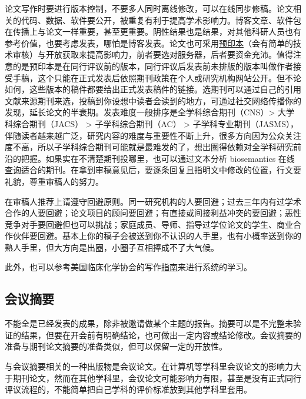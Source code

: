 \documentclass[]{tufte-book}
\begin{document}
论文写作时要进行版本控制，不要多人同时离线修改，可以在线同步修稿。论文相关的代码、数据、软件要公开，被重复有利于提高学术影响力。博客文章、软件包在传播上与论文一样重要，甚至更重要。阴性结果也是结果，对其他科研人员也有参考价值，也要考虑发表，哪怕是博客发表。论文也可采用\href{https://deevybee.blogspot.com/2018/06/preprint-publication-as-karaoke.html}{预印本}（会有简单的技术审核）与开放获取来提高影响力，前者要选对服务器，后者要资金充沛。值得注意的是预印本是在同行评议前的版本，同行评议后发表前未排版的版本叫做作者接受手稿，这个只能在正式发表后依照期刊政策在个人或研究机构网站公开。但不论如何，这些版本的稿件都要给出正式发表稿件的链接。选期刊可以通过自己的引用文献来源期刊来选，投稿到你设想中读者会读到的地方，可通过社交网络传播你的发现，延长论文的半衰期。发表难度一般排序是全学科综合期刊（CNS）\textgreater{} 大学科综合期刊（JACS） \textgreater{} 子学科综合期刊（AC） \textgreater{} 子学科专业期刊（JASMS），伴随读者越来越广泛，研究内容的难度与重要性不断上升，很多方向因为公众关注度不高，所以子学科综合期刊可能就是最难发的了，想出圈得依赖对全学科研究前沿的把握。如果实在不清楚期刊投哪里，也可以通过文本分析 biosemantics 在线\href{https://jane.biosemantics.org/index.php}{查询}适合的期刊。在拿到审稿意见后，要逐条回复且指明文中修改的位置，行文要礼貌，尊重审稿人的努力。

在审稿人推荐上请遵守回避原则。同一研究机构的人要回避；过去三年内有过学术合作的人要回避；论文项目的顾问要回避；有直接或间接利益冲突的要回避；恶性竞争对手要回避但也可以挑战；家庭成员、导师、指导过学位论文的学生、商业合作伙伴要回避。基本上你的稿子会被送到你不认识的人手里，也有小概率送到你的熟人手里，但大方向是出圈，小圈子互相捧成不了大气候。

此外，也可以参考美国临床化学协会的写作\href{http://www.aacc.org/publications/clin_chem/ccgsw/Pages/default.aspx}{指南}来进行系统的学习。

\hypertarget{ux4f1aux8baeux6458ux8981}{%
\subsection{会议摘要}\label{ux4f1aux8baeux6458ux8981}}

不能全是已经发表的成果，除非被邀请做某个主题的报告。摘要可以是不完整未验证的结果，但要在开会前有明确结论，也可做出一定内容或结论修改。会议摘要的准备与期刊论文摘要的准备类似，但可以保留一定的开放性。

与会议摘要相关的一种出版物是会议论文。在计算机等学科里会议论文的影响力大于期刊论文，然而在其他学科里，会议论文可能影响力有限，甚至是没有正式同行评议流程的，不能简单把自己学科的评价标准放到其他学科里套用。
\end{document}
